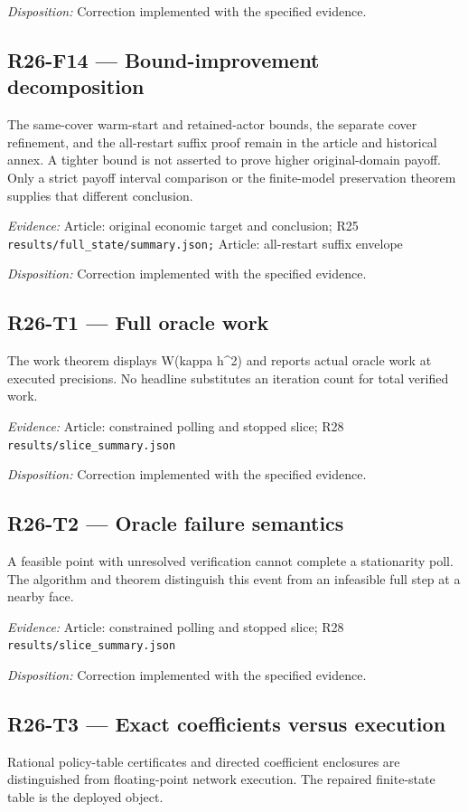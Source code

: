 \emph{Disposition:} Correction implemented with the specified evidence.
\subsection{R26-F14 --- Bound-improvement decomposition}
The same-cover warm-start and retained-actor bounds, the separate cover refinement, and the all-restart suffix proof remain in the article and historical annex. A tighter bound is not asserted to prove higher original-domain payoff. Only a strict payoff interval comparison or the finite-model preservation theorem supplies that different conclusion.

\emph{Evidence:} Article: original economic target and conclusion; R25 \nolinkurl{results/full_state/summary.json;} Article: all-restart suffix envelope

\emph{Disposition:} Correction implemented with the specified evidence.
\subsection{R26-T1 --- Full oracle work}
The work theorem displays W(kappa h\textasciicircum{}2) and reports actual oracle work at executed precisions. No headline substitutes an iteration count for total verified work.

\emph{Evidence:} Article: constrained polling and stopped slice; R28 \nolinkurl{results/slice_summary.json}

\emph{Disposition:} Correction implemented with the specified evidence.
\subsection{R26-T2 --- Oracle failure semantics}
A feasible point with unresolved verification cannot complete a stationarity poll. The algorithm and theorem distinguish this event from an infeasible full step at a nearby face.

\emph{Evidence:} Article: constrained polling and stopped slice; R28 \nolinkurl{results/slice_summary.json}

\emph{Disposition:} Correction implemented with the specified evidence.
\subsection{R26-T3 --- Exact coefficients versus execution}
Rational policy-table certificates and directed coefficient enclosures are distinguished from floating-point network execution. The repaired finite-state table is the deployed object.


